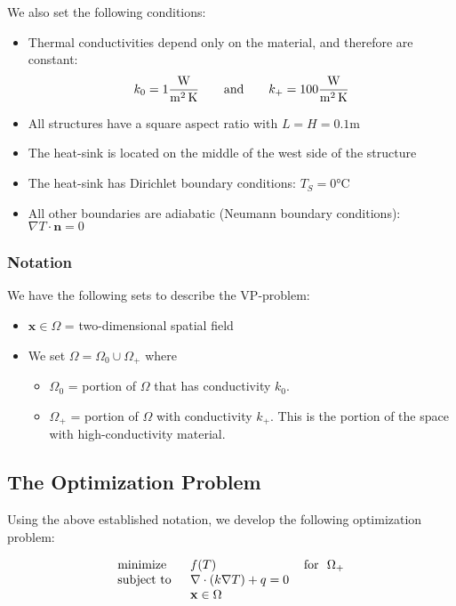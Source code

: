 We also set the following conditions:
\begin{itemize}
	\item Thermal conductivities depend only on the material, and therefore are constant:
	$$k_0=1 \si[per-mode=fraction]{\watt\per\square\meter\per\kelvin}\qquad\text{and}\qquad k_+=100 \si[per-mode=fraction]{\watt\per\square\meter\per\kelvin}$$
	\item All structures have a square aspect ratio with $L=H=0.1\si{\meter}$
	\item The heat-sink is located on the middle of the west side of the structure
	\item The heat-sink has Dirichlet boundary conditions: $T_S=0\si{\celsius}$
	\item All other boundaries are adiabatic (Neumann boundary conditions): $\nabla T\cdot\mathbf{n}=0$
\end{itemize}

\subsubsection*{Notation}

We have the following sets to describe the VP-problem:
\begin{itemize}
	\item $\mathbf{x}\in\Omega$ = two-dimensional spatial field
	\item[] We set $\Omega = \Omega_0\cup\Omega_+$ where
	\begin{itemize}
		\item $\Omega_0$ = portion of $\Omega$ that has conductivity $k_0$.
		\item $\Omega_+$ = portion of $\Omega$ with conductivity $k_+$. This is the portion of the space with high-conductivity material.
	\end{itemize}
\end{itemize}

\subsection{The Optimization Problem}

Using the above established notation, we develop the following optimization problem:

\begin{equation}
	\begin{tabular}{lll}
		\text{minimize }   & $f(T)$                                                   & \text{for } $\Omega_+$ \\
		\text{subject to } & $\nabla\cdot\left(k\nabla T\right)+q=0$  &                                      \\
		& $\mathbf{x}\in\Omega$ &                                      
	\end{tabular}\label{SIMP-Optimization-Problem}
\end{equation}

